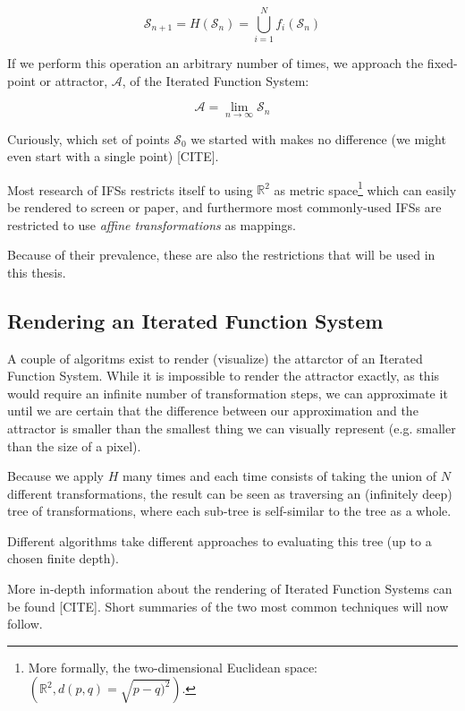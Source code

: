 \documentclass[11pt]{article}
\newcommand*{\altasterism}{\vspace*{1em plus .5em minus .5em}\noindent\hspace*{\fill}\ding{104}\hspace*{\fill}}
\begin{document}
$$ \mathcal{S}_{n + 1} = H(\mathcal{S}_n) = \bigcup_{i=1}^{N} f_i(\mathcal{S}_n) $$

If we perform this operation an arbitrary number of times, we approach the fixed-point or attractor, \(\mathcal{A}\), of the Iterated Function System:

$$\mathcal{A} = \lim_{n \rightarrow \infty} \mathcal{S}_n$$

Curiously, which set of points \(\mathcal{S}_0\) we started with makes no difference (we might even start with a single point) [CITE].

\altasterism

Most research of IFSs restricts itself to using \(\mathbb{R}^2\) as metric space\footnote{More formally, the two-dimensional Euclidean space: \(\left(\mathbb{R}^2, d(p, q) = \sqrt{p - q)^2}\right)\).} which can easily be rendered to screen or paper,
and furthermore most commonly-used IFSs are restricted to use \emph{affine transformations} as mappings.

Because of their prevalence, these are also the restrictions that will be used in this thesis.


\subsection{Rendering an Iterated Function System}
\label{sec:orgd5249dc}

A couple of algoritms exist to render (visualize) the attarctor of an Iterated Function System. 
While it is impossible to render the attractor exactly, as this would require an infinite number of transformation steps,
we can approximate it until we are certain that the difference between our approximation and the attractor is smaller than
the smallest thing we can visually represent (e.g. smaller than the size of a pixel).

Because we apply \(H\) many times and each time consists of taking the union of \(N\) different transformations,
the result can be seen as traversing an (infinitely deep) tree of transformations, 
where each sub-tree is self-similar to the tree as a whole.

Different algorithms take different approaches to evaluating this tree (up to a chosen finite depth).

More in-depth information about the rendering of Iterated Function Systems can be found [CITE]. 
Short summaries of the two most common techniques will now follow.
\end{document}
